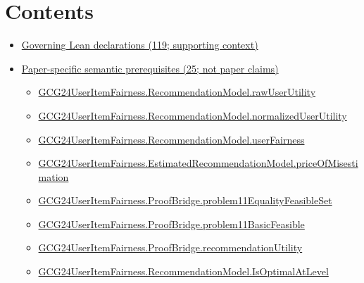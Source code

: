 \documentclass[10pt]{article}
\begin{document}
\section*{Contents}
\begin{itemize}[leftmargin=1.2em]
\item \hyperlink{governing-declaration-section-5ef5ef0364b6939c}{Governing Lean declarations (119; supporting context)}
\item \hyperlink{paper-prerequisite-section-5ef5ef0364b6939c}{Paper-specific semantic prerequisites (25; not paper claims)}
\begin{itemize}[leftmargin=1.2em]
\item \hyperlink{paper-prerequisite-4c12034215b920ef}{GCG24\allowbreak{}User\allowbreak{}Item\allowbreak{}Fairness.\allowbreak{}Recommendation\allowbreak{}Model.\allowbreak{}raw\allowbreak{}User\allowbreak{}Utility}
\item \hyperlink{paper-prerequisite-8b8c6588033e8ed1}{GCG24\allowbreak{}User\allowbreak{}Item\allowbreak{}Fairness.\allowbreak{}Recommendation\allowbreak{}Model.\allowbreak{}normalized\allowbreak{}User\allowbreak{}Utility}
\item \hyperlink{paper-prerequisite-e6f0823c4d783c83}{GCG24\allowbreak{}User\allowbreak{}Item\allowbreak{}Fairness.\allowbreak{}Recommendation\allowbreak{}Model.\allowbreak{}user\allowbreak{}Fairness}
\item \hyperlink{paper-prerequisite-081a4236b4933494}{GCG24\allowbreak{}User\allowbreak{}Item\allowbreak{}Fairness.\allowbreak{}Estimated\allowbreak{}Recommendation\allowbreak{}Model.\allowbreak{}price\allowbreak{}Of\allowbreak{}Misestimation}
\item \hyperlink{paper-prerequisite-b6d57d5de69ac660}{GCG24\allowbreak{}User\allowbreak{}Item\allowbreak{}Fairness.\allowbreak{}Proof\allowbreak{}Bridge.\allowbreak{}problem11\allowbreak{}Equality\allowbreak{}Feasible\allowbreak{}Set}
\item \hyperlink{paper-prerequisite-2cefb4a6370a37cb}{GCG24\allowbreak{}User\allowbreak{}Item\allowbreak{}Fairness.\allowbreak{}Proof\allowbreak{}Bridge.\allowbreak{}problem11\allowbreak{}Basic\allowbreak{}Feasible}
\item \hyperlink{paper-prerequisite-6f8d68c5c1b5aa5e}{GCG24\allowbreak{}User\allowbreak{}Item\allowbreak{}Fairness.\allowbreak{}Proof\allowbreak{}Bridge.\allowbreak{}recommendation\allowbreak{}Utility}
\item \hyperlink{paper-prerequisite-4b6f9efb494da04e}{GCG24\allowbreak{}User\allowbreak{}Item\allowbreak{}Fairness.\allowbreak{}Recommendation\allowbreak{}Model.\allowbreak{}Is\allowbreak{}Optimal\allowbreak{}At\allowbreak{}Level}

\end{itemize}
\end{itemize}
\end{document}
